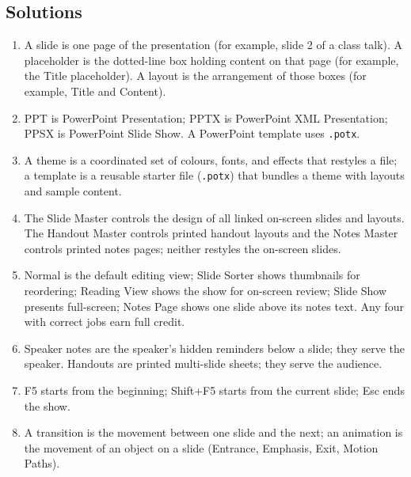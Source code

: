 \documentclass[11pt]{article}
\begin{document}
\subsection*{Solutions}
\begingroup\small
\begin{enumerate}[label=\arabic*.]
  \item A slide is one page of the presentation (for example, slide 2 of a
    class talk). A placeholder is the dotted-line box holding content on that
    page (for example, the Title placeholder). A layout is the arrangement of
    those boxes (for example, Title and Content).
  \item PPT is PowerPoint Presentation; PPTX is PowerPoint XML Presentation;
    PPSX is PowerPoint Slide Show. A PowerPoint template uses
    \texttt{.potx}.
  \item A theme is a coordinated set of colours, fonts, and effects that
    restyles a file; a template is a reusable starter file
    (\texttt{.potx}) that bundles a theme with layouts and sample content.
  \item The Slide Master controls the design of all linked on-screen slides
    and layouts. The Handout Master controls printed handout layouts and the
    Notes Master controls printed notes pages; neither restyles the on-screen
    slides.
  \item Normal is the default editing view; Slide Sorter shows thumbnails for
    reordering; Reading View shows the show for on-screen review; Slide Show
    presents full-screen; Notes Page shows one slide above its notes text.
    Any four with correct jobs earn full credit.
  \item Speaker notes are the speaker's hidden reminders below a slide; they
    serve the speaker. Handouts are printed multi-slide sheets; they serve
    the audience.
  \item F5 starts from the beginning; Shift+F5 starts from the current slide;
    Esc ends the show.
  \item A transition is the movement between one slide and the next; an
    animation is the movement of an object on a slide (Entrance, Emphasis,
    Exit, Motion Paths).
\end{enumerate}
\endgroup
\end{document}
